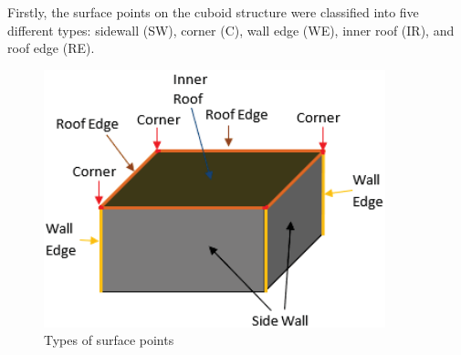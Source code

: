 \documentclass{beamer}
\begin{document}
\begin{frame}{}
    \begin{block}
    \justifying
        \;\;\;\;\;\;\; Firstly, the surface points on the cuboid structure were classified into five different types: sidewall (SW), corner (C), wall edge (WE), inner roof (IR), and roof edge (RE).
        \begin{figure}
            \centering
            \includegraphics[width=0.5\columnwidth]{Figures/Surface_pts.png}
            \caption{Types of surface points}
            \label{Surface_pts}
        \end{figure}
    \end{block}
\end{frame}
\end{document}
